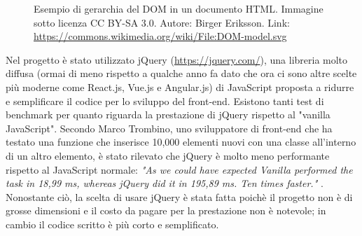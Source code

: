 \documentclass[12pt]{report}
\begin{document}
\begin{figure}
	\caption{Esempio di gerarchia del DOM in un documento HTML. Immagine sotto licenza CC BY-SA 3.0. Autore: Birger Eriksson. Link: \url{https://commons.wikimedia.org/wiki/File:DOM-model.svg}}
	\label{fig:dom}
\end{figure}

Nel progetto è stato utilizzato jQuery (\url{https://jquery.com/}), una libreria molto diffusa (ormai di meno rispetto a qualche anno fa dato che ora ci sono altre scelte più moderne come React.js, Vue.js e Angular.js) di JavaScript proposta a ridurre e semplificare il codice per lo sviluppo del front-end. Esistono tanti test di benchmark per quanto riguarda la prestazione di jQuery rispetto al "vanilla JavaScript". Secondo Marco Trombino, uno sviluppatore di front-end che ha testato una funzione che inserisce 10,000 elementi nuovi con una classe all'interno di un altro elemento, è stato rilevato che jQuery è molto meno performante rispetto al JavaScript normale: \textit{"As we could have expected Vanilla performed the task in 18,99 ms, whereas jQuery did it in 195,89 ms. Ten times faster."} \cite{jquery}. Nonostante ciò, la scelta di usare jQuery è stata fatta poichè il progetto non è di grosse dimensioni e il costo da pagare per la prestazione non è notevole; in cambio il codice scritto è più corto e semplificato. 
\end{document}
